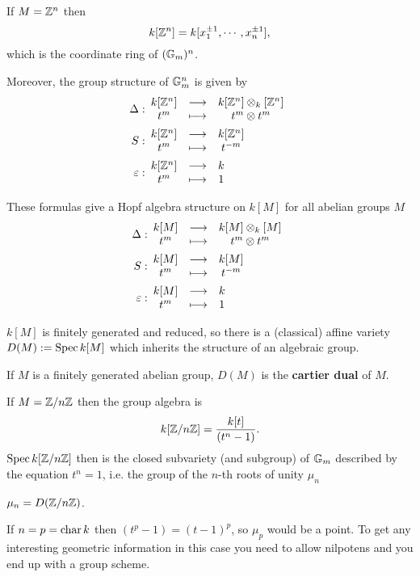 \begin{example}
If $M=\mathbb{Z}^n$ then
\[k[\mathbb{Z}^n]=k[x_1^{\pm1},\cdots,x_n^{\pm1}],\]
which is the coordinate ring of $(\mathbb{G}_m)^n$.

Moreover, the group structure of $\mathbb{G}_m^n$ is given by
\begin{align*}
\Delta:&\begin{array}{ccc} {k[\mathbb{Z}^n]} & \longrightarrow & {k[\mathbb{Z}^n]\otimes_k[\mathbb{Z}^n]}\\ {t^m} & \longmapsto & {t^m\otimes t^m} \end{array}\\
S:&\begin{array}{ccc} {k[\mathbb{Z}^n]} & \longrightarrow & {k[\mathbb{Z}^n]}\\ {t^m} & \longmapsto & {t^{-m}} \end{array}\\
\varepsilon:&\begin{array}{ccc} {k[\mathbb{Z}^n]} & \longrightarrow & {k}\\ {t^m} & \longmapsto & {1} \end{array}
\end{align*}
\end{example}

\begin{fact}
These formulas give a Hopf algebra structure on $k[M]$ for all abelian groups $M$
\begin{align*}
\Delta:&\begin{array}{ccc} {k[M]} & \longrightarrow & {k[M]\otimes_k[M]}\\ {t^m} & \longmapsto & {t^m\otimes t^m} \end{array}\\
S:&\begin{array}{ccc} {k[M]} & \longrightarrow & {k[M]}\\ {t^m} & \longmapsto & {t^{-m}} \end{array}\\
\varepsilon:&\begin{array}{ccc} {k[M]} & \longrightarrow & {k}\\ {t^m} & \longmapsto & {1} \end{array}
\end{align*}
\end{fact}

\begin{remark}
$k[M]$ is finitely generated and reduced, so there is a (classical) affine variety $D(M):=\operatorname{Spec} k[M]$ which inherits the structure of an algebraic group.
\end{remark}


\begin{definition}
If $M$ is a finitely generated abelian group, $D(M)$ is the \textbf{cartier dual} of $M$.
\end{definition}

\begin{example}
If $M={\mathbb{Z}/{n}\mathbb{Z}}$ then the group algebra is
\[k[{\mathbb{Z}/{n}\mathbb{Z}}]=\frac{k[t]}{(t^n-1)}.\]
$\operatorname{Spec} k[{\mathbb{Z}/{n}\mathbb{Z}}]$ then is the closed subvariety (and subgroup) of $\mathbb{G}_m$ described by the equation $t^n=1$, i.e. the group of the $n$-th roots of unity $\mu_n$
\end{example}

\begin{definition}
$\mu_n=D({\mathbb{Z}/{n}\mathbb{Z}})$.
\end{definition}

\begin{remark}
If $n=p=\operatorname{char} k$ then $(t^p-1)=(t-1)^p$, so $\mu_p$ would be a point. To get any interesting geometric information in this case you need to allow nilpotens and you end up with a group scheme.
\end{remark}



